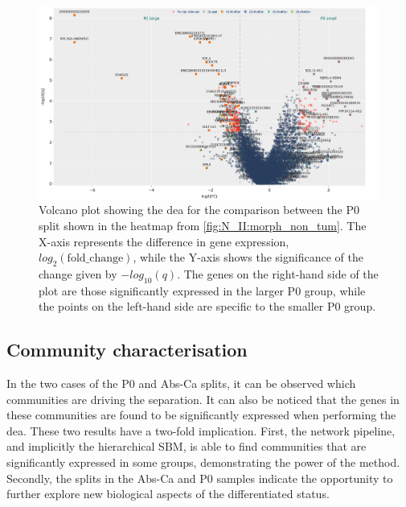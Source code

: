 \begin{figure}[H]    
    \centering
    \includegraphics[width=1.0\textwidth,height=1.0\textheight,keepaspectratio]{Sections/Network_II/resources/non_tum/p0_split_dea.png}
    \caption{Volcano plot showing the \acrfull{dea} for the comparison between the P0 split shown in the heatmap from \cref{fig:N_II:morph_non_tum}. The X-axis represents the difference in gene expression, $log_2(\text{fold\_change})$, while the Y-axis shows the significance of the change given by $-log_{10}(q)$. The genes on the right-hand side of the plot are those significantly expressed in the larger P0 group, while the points on the left-hand side are specific to the smaller P0 group.}
    \label{fig:N_II:p0_split}
\end{figure}




\subsection{Community characterisation} \label{s:N_II:comm_charact}

In the two cases of the P0 and Abs-Ca splits, it can be observed which communities are driving the separation. It can also be noticed that the genes in these communities are found to be significantly expressed when performing the \acrlong{dea}. These two results have a two-fold implication. First, the network pipeline, and implicitly the hierarchical SBM, is able to find communities that are significantly expressed in some groups, demonstrating the power of the method. Secondly, the splits in the Abs-Ca and P0 samples indicate the opportunity to further explore new biological aspects of the differentiated status.

